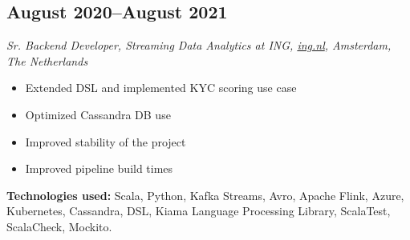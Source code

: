 \subsection*{August 2020--August 2021}

\textit{Sr. Backend Developer, Streaming Data Analytics at ING, \href{https://ing.nl}{\url{ing.nl}}, Amsterdam, The Netherlands}

\begin{itemize}[noitemsep]
  \item Extended DSL and implemented KYC scoring use case
  \item Optimized Cassandra DB use
  \item Improved stability of the project
  \item Improved pipeline build times
\end{itemize}

\textbf{Technologies used:}
Scala, Python, Kafka Streams, Avro, Apache Flink, Azure, Kubernetes, Cassandra,
 DSL, Kiama Language Processing Library, ScalaTest, ScalaCheck, Mockito.
